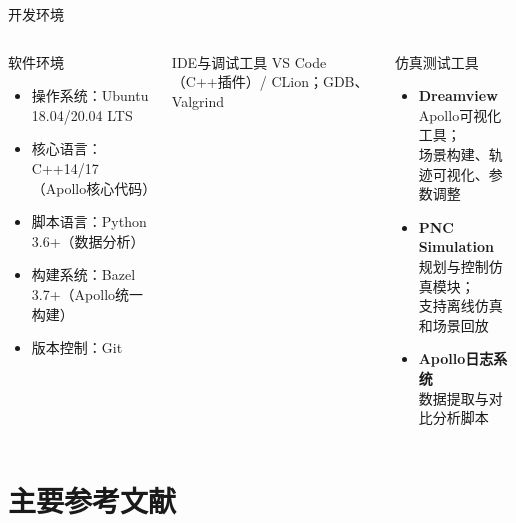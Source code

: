 \documentclass{beamer}
\begin{document}
\begin{frame}{开发环境}
  \begin{columns}[T]
    \begin{block}{软件环境}
      \begin{itemize}
        \item 操作系统：Ubuntu 18.04/20.04 LTS
        \item 核心语言：C++14/17（Apollo核心代码）
        \item 脚本语言：Python 3.6+（数据分析）
        \item 构建系统：Bazel 3.7+（Apollo统一构建）
        \item 版本控制：Git
      \end{itemize}
    \end{block}
    \vspace{0.3em}
    \begin{block}{IDE与调试工具}
      VS Code（C++插件）/ CLion；GDB、Valgrind
    \end{block}

    \begin{block}{仿真测试工具}
      \begin{itemize}
        \item \textbf{Dreamview}\\
              Apollo可视化工具；\\
              场景构建、轨迹可视化、参数调整
        \item \textbf{PNC Simulation}\\
              规划与控制仿真模块；\\
              支持离线仿真和场景回放
        \item \textbf{Apollo日志系统}\\
              数据提取与对比分析脚本
      \end{itemize}
    \end{block}
  \end{columns}
\end{frame}

\section{主要参考文献}
\end{document}
